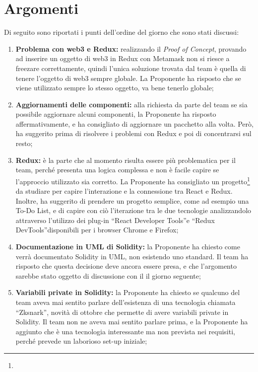 \documentclass[VER-2018-01-09.tex]{subfiles}
\begin{document}
\section{Argomenti}
Di seguito sono riportati i punti dell'ordine del giorno che sono stati discussi:
\begin{enumerate}
	\item \textbf{Problema con web3 e Redux:} realizzando il \textit{Proof of Concept}, provando ad inserire un oggetto di web3 in Redux con Metamask non si riesce a freezare correttamente, quindi l'unica soluzione trovata dal team è quella di tenere l'oggetto di web3 sempre globale. La Proponente ha risposto che se viene utilizzato sempre lo stesso oggetto, va bene tenerlo globale;
	\item \textbf{Aggiornamenti delle componenti:} alla richiesta da parte del team se sia possibile aggiornare alcuni componenti, la Proponente ha risposto affermativamente, e ha consigliato di aggiornare un pacchetto alla volta. Però, ha suggerito prima di risolvere i problemi con Redux e poi di concentrarsi sul resto;
	\item \textbf{Redux:} è la parte che al momento risulta essere più problematica per il team, perché presenta una logica complessa e non è facile capire se l'approccio utilizzato sia corretto. La Proponente ha consigliato un progetto\footnote{} da studiare per capire l'interazione e la connessione tra React e Redux. Inoltre, ha suggerito di prendere un progetto semplice, come ad esempio una To-Do List, e di capire con ciò l'iterazione tra le due tecnologie analizzandolo attraverso l'utilizzo dei plug-in \textquotedblleft React Developer Tools\textquotedblright e \textquotedblleft Redux DevTools\textquotedblright disponibili per i browser Chrome e Firefox;
	\item \textbf{Documentazione in UML di Solidity:} la Proponente ha chiesto come verrà documentato Solidity in UML, non esistendo uno standard. Il team ha risposto che questa decisione deve ancora essere presa, e che l'argomento sarebbe stato oggetto di discussione con il \Vardanega il giorno seguente;
	\item \textbf{Variabili private in Solidity:} la Proponente ha chiesto se qualcuno del team aveva mai sentito parlare dell'esistenza di una tecnologia chiamata \textquotedblleft Zksnark\textquotedblright, novità di ottobre che permette di avere variabili private in Solidity. Il team non ne aveva mai sentito parlare prima, e la Proponente ha aggiunto che è una tecnologia interessante ma non prevista nei requisiti, perché prevede un laborioso set-up iniziale;

\end{enumerate}
\end{document}
